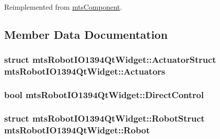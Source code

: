 Reimplemented from \hyperlink{classmts_component_aaf28f0262b44eb6866e10089a02fa6e4}{mts\-Component}.



\subsection{Member Data Documentation}
\hypertarget{classmts_robot_i_o1394_qt_widget_a68401b5200788155540f952697487364}{
\subsubsection[{Actuators}]{\setlength{\rightskip}{0pt plus 5cm}struct {\bf mts\-Robot\-I\-O1394\-Qt\-Widget\-::\-Actuator\-Struct}  mts\-Robot\-I\-O1394\-Qt\-Widget\-::\-Actuators\hspace{0.3cm}{\ttfamily [protected]}}}\label{classmts_robot_i_o1394_qt_widget_a68401b5200788155540f952697487364}
\hypertarget{classmts_robot_i_o1394_qt_widget_ae0e6af9087d5457633b4d42a93c63bcd}{
\subsubsection[{Direct\-Control}]{\setlength{\rightskip}{0pt plus 5cm}bool mts\-Robot\-I\-O1394\-Qt\-Widget\-::\-Direct\-Control\hspace{0.3cm}{\ttfamily [protected]}}}\label{classmts_robot_i_o1394_qt_widget_ae0e6af9087d5457633b4d42a93c63bcd}
\hypertarget{classmts_robot_i_o1394_qt_widget_ade381e042472af642876b731415a18af}{
\subsubsection[{Robot}]{\setlength{\rightskip}{0pt plus 5cm}struct {\bf mts\-Robot\-I\-O1394\-Qt\-Widget\-::\-Robot\-Struct}  mts\-Robot\-I\-O1394\-Qt\-Widget\-::\-Robot\hspace{0.3cm}{\ttfamily [protected]}}}\label{classmts_robot_i_o1394_qt_widget_ade381e042472af642876b731415a18af}
